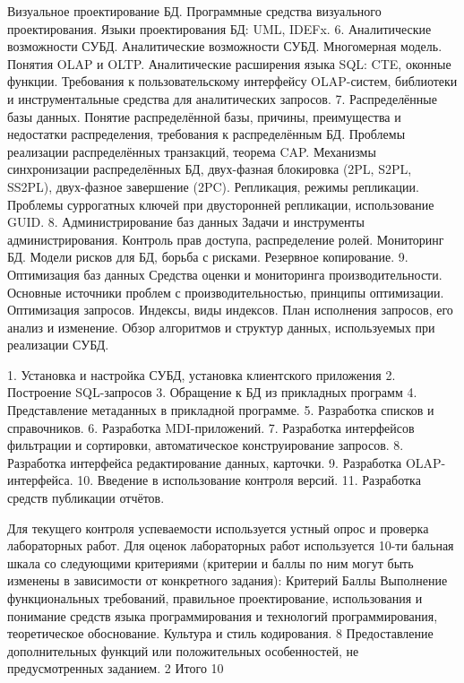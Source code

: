 \documentclass[a4paper]{article}
\begin{document}
	Визуальное проектирование БД. Программные средства визуального проектирования. Языки проектирования БД: UML, IDEFx.
6.	Аналитические возможности СУБД.
	Аналитические возможности СУБД.  Многомерная модель. Понятия OLAP и OLTP. Аналитические расширения языка SQL: CTE, оконные функции.
	Требования к пользовательскому интерфейсу OLAP-систем, библиотеки и инструментальные средства для аналитических запросов.
7.	Распределённые базы данных.
	Понятие распределённой базы, причины, преимущества и недостатки распределения, требования к распределённым БД. Проблемы реализации распределённых транзакций, теорема CAP.
	Механизмы синхронизации распределённых БД, двух-фазная блокировка (2PL, S2PL, SS2PL), двух-фазное завершение (2PC).
	Репликация, режимы репликации. Проблемы суррогатных ключей при двусторонней репликации, использование GUID.
8.	Администрирование баз данных
	Задачи и инструменты администрирования. Контроль прав доступа, распределение ролей. Мониторинг БД.
	Модели рисков для БД, борьба с рисками. Резервное копирование.
9.	Оптимизация баз данных
	Средства оценки и мониторинга производительности. Основные источники проблем с производительностью, принципы оптимизации.
	Оптимизация запросов. Индексы, виды индексов. План исполнения запросов, его анализ и изменение.
	Обзор алгоритмов и структур данных, используемых при реализации СУБД.

\CoursePracticeSection

1.	Установка и настройка СУБД, установка клиентского приложения
2.	Построение SQL-запросов
3.	Обращение к БД из прикладных программ
4.	Представление метаданных в прикладной программе.
5.	Разработка списков и справочников.
6.	Разработка MDI-приложений.
7.	Разработка интерфейсов фильтрации и сортировки, автоматическое конструирование запросов.
8.	Разработка интерфейса редактирование данных, карточки.
9.	Разработка OLAP-интерфейса.
10.	Введение в использование контроля версий.
11.	Разработка средств публикации отчётов.

\CourseControlSection

Для текущего контроля успеваемости используется устный опрос и проверка лабораторных работ.
Для оценок лабораторных работ используется 10-ти бальная шкала со следующими критериями (критерии и баллы по ним могут быть изменены в зависимости от конкретного задания):
Критерий	Баллы
Выполнение функциональных требований, правильное проектирование, использования и понимание средств языка программирования и технологий программирования, теоретическое обоснование. Культура и стиль кодирования.	8
Предоставление дополнительных функций или положительных особенностей, не предусмотренных заданием.	2
Итого	10
\end{document}
